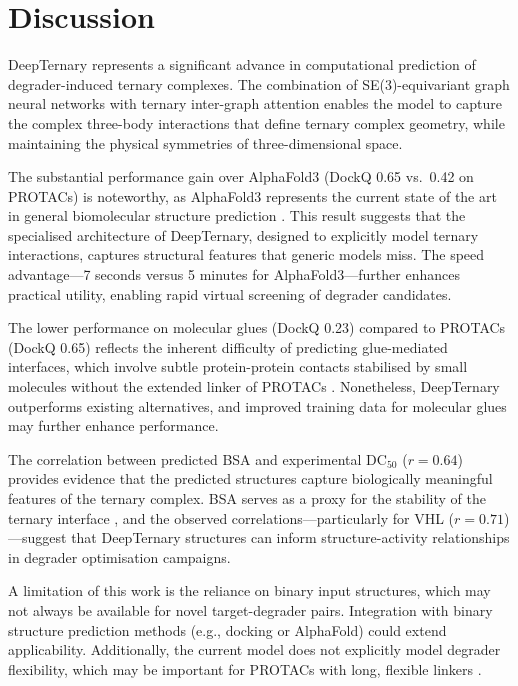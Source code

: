 \documentclass[11pt]{article}
\begin{document}
\section{Discussion}

DeepTernary represents a significant advance in computational prediction of degrader-induced ternary complexes. The combination of SE(3)-equivariant graph neural networks with ternary inter-graph attention enables the model to capture the complex three-body interactions that define ternary complex geometry, while maintaining the physical symmetries of three-dimensional space.

The substantial performance gain over AlphaFold3 (DockQ 0.65 vs.\ 0.42 on PROTACs) is noteworthy, as AlphaFold3 represents the current state of the art in general biomolecular structure prediction \citep{abramson2024}. This result suggests that the specialised architecture of DeepTernary, designed to explicitly model ternary interactions, captures structural features that generic models miss. The speed advantage---7 seconds versus 5 minutes for AlphaFold3---further enhances practical utility, enabling rapid virtual screening of degrader candidates.

The lower performance on molecular glues (DockQ 0.23) compared to PROTACs (DockQ 0.65) reflects the inherent difficulty of predicting glue-mediated interfaces, which involve subtle protein-protein contacts stabilised by small molecules without the extended linker of PROTACs \citep{slabicki2020}. Nonetheless, DeepTernary outperforms existing alternatives, and improved training data for molecular glues may further enhance performance.

The correlation between predicted BSA and experimental DC$_{50}$ ($r = 0.64$) provides evidence that the predicted structures capture biologically meaningful features of the ternary complex. BSA serves as a proxy for the stability of the ternary interface \citep{gadd2017}, and the observed correlations---particularly for VHL ($r = 0.71$)---suggest that DeepTernary structures can inform structure-activity relationships in degrader optimisation campaigns.

A limitation of this work is the reliance on binary input structures, which may not always be available for novel target-degrader pairs. Integration with binary structure prediction methods (e.g., docking or AlphaFold) could extend applicability. Additionally, the current model does not explicitly model degrader flexibility, which may be important for PROTACs with long, flexible linkers \citep{drummond2020}.
\end{document}
